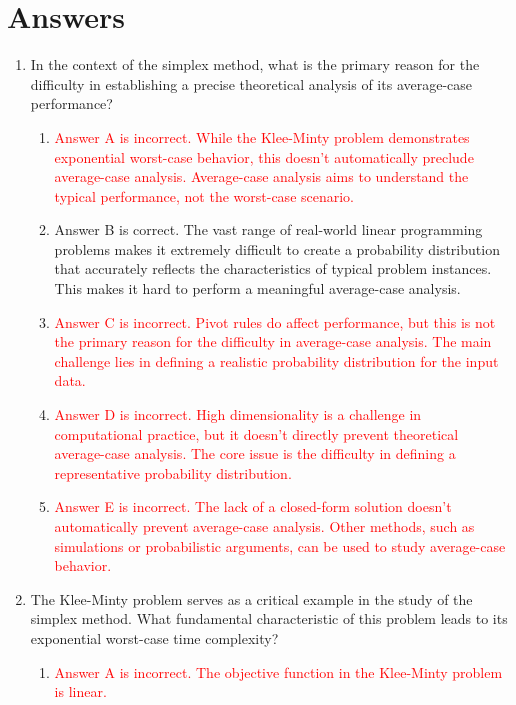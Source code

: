 \documentclass{article}%
\newcommand{\incorrect}[1]{\textcolor{red}{#1}}
\begin{document}
%
\newpage%
\section{Answers}%
\label{sec:Answers}%
\begin{enumerate}%
\item In the context of the simplex method, what is the primary reason for the difficulty in establishing a precise theoretical analysis of its average-case performance?%
\begin{enumerate}%
\item \incorrect{Answer A is incorrect. While the Klee-Minty problem demonstrates exponential worst-case behavior, this doesn't automatically preclude average-case analysis.  Average-case analysis aims to understand the typical performance, not the worst-case scenario.}%
\item Answer B is correct.  The vast range of real-world linear programming problems makes it extremely difficult to create a probability distribution that accurately reflects the characteristics of typical problem instances. This makes it hard to perform a meaningful average-case analysis.%
\item \incorrect{Answer C is incorrect.  Pivot rules do affect performance, but this is not the primary reason for the difficulty in average-case analysis.  The main challenge lies in defining a realistic probability distribution for the input data.}%
\item \incorrect{Answer D is incorrect.  High dimensionality is a challenge in computational practice, but it doesn't directly prevent theoretical average-case analysis. The core issue is the difficulty in defining a representative probability distribution.}%
\item \incorrect{Answer E is incorrect. The lack of a closed-form solution doesn't automatically prevent average-case analysis.  Other methods, such as simulations or probabilistic arguments, can be used to study average-case behavior.}%
\end{enumerate}%
\vspace{1em}%
\item The Klee-Minty problem serves as a critical example in the study of the simplex method. What fundamental characteristic of this problem leads to its exponential worst-case time complexity?%
\begin{enumerate}%
\item \incorrect{Answer A is incorrect. The objective function in the Klee-Minty problem is linear.}%

\end{enumerate}
\end{enumerate}
\end{document}

